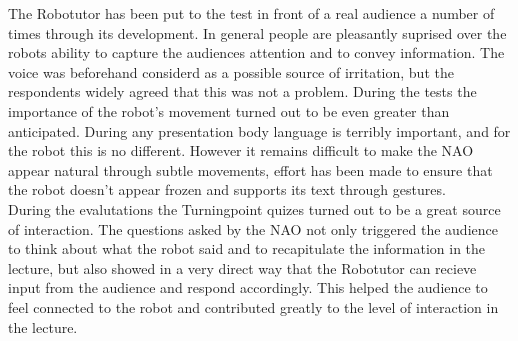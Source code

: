 The Robotutor has been put to the test in front of a real audience a number of times through its development. In general people are pleasantly suprised over the robots ability to capture the audiences attention and to convey information. The voice was beforehand considerd as a possible source of irritation, but the respondents widely agreed that this was not a problem. During the tests the importance of the robot's movement turned out to be even greater than anticipated. During any presentation body language is terribly important, and for the robot this is no different. However it remains difficult to make the NAO appear natural through subtle movements, effort has been made to ensure that the robot doesn't appear frozen and supports its text through gestures. \\

During the evalutations the Turningpoint quizes turned out to be a great source of interaction. The questions asked by the NAO  not only triggered the audience to think about what the robot said and to recapitulate the information in the lecture, but also showed in a very direct way that the Robotutor can recieve input from the audience and respond accordingly. This helped the audience to feel connected to the robot and contributed greatly to the level of interaction in the lecture.